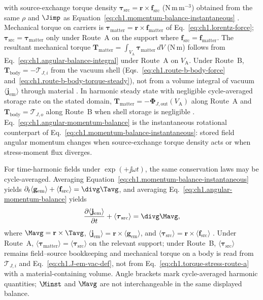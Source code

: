with source-exchange torque density $\boldsymbol{\tau}_{\mathrm{src}}=\mathbf{r}\times\mathbf{f}_{\mathrm{src}}$ (N\,m\,m$^{-3}$) obtained from the same $\rho$ and $\Jimp$ as Equation~\eqref{eq:ch1.momentum-balance-instantaneous} \cite{maxwell1873,stratton1941}. Mechanical torque on carriers is $\boldsymbol{\tau}_{\mathrm{matter}}=\mathbf{r}\times\mathbf{f}_{\mathrm{matter}}$ of Eq.~\eqref{eq:ch1.lorentz-force}; $\boldsymbol{\tau}_{\mathrm{src}}=\boldsymbol{\tau}_{\mathrm{matter}}$ only under Route~A on the support where $\mathbf{f}_{\mathrm{src}}=\mathbf{f}_{\mathrm{matter}}$. The resultant mechanical torque $\mathbf{T}_{\mathrm{matter}}=\int_{V_{\mathrm{A}}}\boldsymbol{\tau}_{\mathrm{matter}}\,dV$ (N\,m) follows from Eq.~\eqref{eq:ch1.angular-balance-integral} under Route~A on $V_{\mathrm{A}}$. Under Route~B, $\mathbf{T}_{\mathrm{body}}=-\boldsymbol{\mathcal{T}}_{J,i}$ from the vacuum shell (Eqs.~\eqref{eq:ch1.route-b-body-force} and~\eqref{eq:ch1.route-b-body-torque-steady}), not from a volume integral of vacuum $\langle\mathbf{j}_{\mathrm{em}}\rangle$ through material \cite{stratton1941,beth1936,harrington2001}. In harmonic steady state with negligible cycle-averaged storage rate on the stated domain, $\mathbf{T}_{\mathrm{matter}}=-\boldsymbol{\Phi}_{J,\mathrm{out}}(V_{\mathrm{A}})$ along Route~A and $\mathbf{T}_{\mathrm{body}}=\boldsymbol{\mathcal{T}}_{J,o}$ along Route~B when shell storage is negligible \cite{beth1936}. Eq.~\eqref{eq:ch1.angular-momentum-balance} is the instantaneous rotational counterpart of Eq.~\eqref{eq:ch1.momentum-balance-instantaneous}: stored field angular momentum changes when source-exchange torque density acts or when stress-moment flux diverges.

For time-harmonic fields under $\exp(+\jj\omega t)$, the same conservation laws may be cycle-averaged. Averaging Equation~\eqref{eq:ch1.momentum-balance-instantaneous} yields $\partial_t\langle\mathbf{g}_{\mathrm{em}}\rangle+\langle\mathbf{f}_{\mathrm{src}}\rangle=\divg\Tavg$, and averaging Eq.~\eqref{eq:ch1.angular-momentum-balance} yields
\begin{equation}
\label{eq:ch1.angular-momentum-balance-averaged}
\frac{\partial\langle\mathbf{j}_{\mathrm{em}}\rangle}{\partial t}+\langle\boldsymbol{\tau}_{\mathrm{src}}\rangle
=\divg\Mavg,
\end{equation}
where $\Mavg=\mathbf{r}\times\Tavg$, $\langle\mathbf{j}_{\mathrm{em}}\rangle=\mathbf{r}\times\langle\mathbf{g}_{\mathrm{em}}\rangle$, and $\langle\boldsymbol{\tau}_{\mathrm{src}}\rangle=\mathbf{r}\times\langle\mathbf{f}_{\mathrm{src}}\rangle$ \cite{stratton1941}. Under Route~A, $\langle\boldsymbol{\tau}_{\mathrm{matter}}\rangle=\langle\boldsymbol{\tau}_{\mathrm{src}}\rangle$ on the relevant support; under Route~B, $\langle\boldsymbol{\tau}_{\mathrm{src}}\rangle$ remains field--source bookkeeping and mechanical torque on a body is read from $\boldsymbol{\mathcal{T}}_{J,i}$ and Eq.~\eqref{eq:ch1.J-em-vac-def}, not from Eq.~\eqref{eq:ch1.torque-stress-route-a} with a material-containing volume. Angle brackets mark cycle-averaged harmonic quantities; $\Minst$ and $\Mavg$ are not interchangeable in the same displayed balance.

